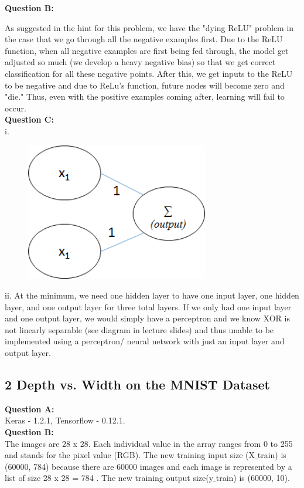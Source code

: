 \documentclass[12 pt]{article}
\begin{document}
	\noindent\textbf{Question B:}  
	
	\noindent As suggested in the hint for this problem, we have the "dying ReLU" problem in the case that we go through all the negative examples first. Due to the ReLU function, when all negative examples are first being fed through, the model get adjusted so much (we develop a heavy negative bias) so that we get correct classification for all these negative points. After this, we get inputs to the ReLU to be negative and due to ReLu's function, future nodes will become zero and "die." Thus, even with the positive examples coming after, learning will fail to occur.   \\
	
	
	\noindent\textbf{Question C:}  \\
	i. 
	\begin{figure}[H]
	\centering
	\includegraphics[width=8cm]{OR}
	\end{figure}
	\noindent ii. At the minimum, we need one hidden layer to have one input layer, one hidden layer, and one output layer for three total layers. If we only had one input layer and one output layer, we would simply have a perceptron and we know XOR is not linearly separable (see diagram in lecture slides) and thus unable to be implemented using a perceptron/ neural network with just an input layer and output layer.
	
	\subsection*{2 Depth vs. Width on the MNIST Dataset}
	\noindent\textbf{Question A:} \\ Keras - 1.2.1, Tensorflow - 0.12.1. \\
	
	\noindent\textbf{Question B:} \\ The images are 28 x 28. Each individual value in the array ranges from 0 to 255 and stands for the pixel value (RGB). The new training input size (X$\_$train) is (60000, 784) because there are 60000 images and each image is represented by a list of size 28 x 28 = 784 . The new training output size(y$\_$train) is (60000, 10).\\
\end{document}
